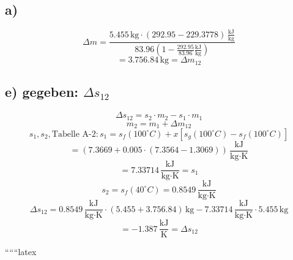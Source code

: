 \subsection*{a)}
\[
\Delta m = \frac{5.455 \, \text{kg} \cdot \left( 292.95 - 229.3778 \right) \, \frac{\text{kJ}}{\text{kg}}}{83.96 \left( 1 - \frac{292.95}{83.96} \frac{\text{kJ}}{\text{kg}} \right)}
\]
\[
= 3.756.84 \, \text{kg} = \Delta m_{12}
\]

\subsection*{e) gegeben: \(\Delta s_{12}\)}
\[
\Delta s_{12} = s_2 \cdot m_2 - s_1 \cdot m_1
\]
\[
m_2 = m_1 + \Delta m_{12}
\]
\[
s_1, s_2, \text{Tabelle A-2}: s_1 = s_f (100^\circ C) + x \left[ s_g (100^\circ C) - s_f (100^\circ C) \right]
\]
\[
= (7.3669 + 0.005 \cdot (7.3564 - 1.3069)) \, \frac{\text{kJ}}{\text{kg} \cdot \text{K}}
\]
\[
= 7.33714 \, \frac{\text{kJ}}{\text{kg} \cdot \text{K}} = s_1
\]
\[
s_2 = s_f (40^\circ C) = 0.8549 \, \frac{\text{kJ}}{\text{kg} \cdot \text{K}}
\]
\[
\Delta s_{12} = 0.8549 \, \frac{\text{kJ}}{\text{kg} \cdot \text{K}} \cdot (5.455 + 3.756.84) \, \text{kg} - 7.33714 \, \frac{\text{kJ}}{\text{kg} \cdot \text{K}} \cdot 5.455 \, \text{kg}
\]
\[
= -1.387 \, \frac{\text{kJ}}{\text{K}} = \Delta s_{12}
\]

``````latex


